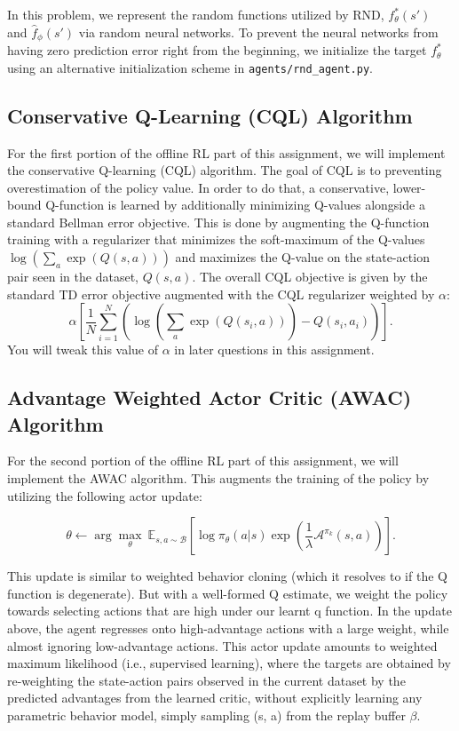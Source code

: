 \documentclass{article}
\begin{document}
In this problem, we represent the random functions utilized by RND, $f^*_\theta(s')$ and $\hat{f}_\phi(s')$ via random neural networks. To prevent the neural networks from having zero prediction error right from the beginning, we initialize the target $f^*_\theta$ using an alternative initialization scheme in \verb+agents/rnd_agent.py+. 

\subsection{Conservative Q-Learning (CQL) Algorithm}
For the first portion of the offline RL part of this assignment, we will implement the conservative Q-learning (CQL) algorithm. The goal of CQL is to preventing overestimation of the policy value. In order to do that, a conservative, lower-bound Q-function is learned by additionally minimizing Q-values alongside a standard Bellman error objective. This is done by augmenting the Q-function training with a regularizer that minimizes the soft-maximum of the Q-values $\log \left( \sum_{a} \exp(Q(s, a)) \right)$ and maximizes the Q-value on the state-action pair seen in the dataset, $Q(s, a)$. The overall CQL objective is given by the standard TD error objective augmented with the CQL regularizer weighted by $\alpha$: 
\[\alpha \left[\frac{1}{N}\sum_{i=1}^N \left(\log\left(\sum_{a} \exp(Q(s_i, a))\right) - Q(s_i, a_i) \right) \right].\] 
You will tweak this value of $\alpha$ in later questions in this assignment.  

\subsection{Advantage Weighted Actor Critic (AWAC) Algorithm}
For the second portion of the offline RL part of this assignment, we will implement the AWAC algorithm. This augments the training of the policy by utilizing the following actor update:

\begin{equation}
    \theta \leftarrow \arg \max_\theta~ \mathbb{E}_{s, a \sim \mathcal{B}} \left[\log \pi_{\theta}(a|s) \exp\left(\frac{1}{\lambda} \mathcal{A}^{\pi_{k}}(s,a)\right) \right].
\end{equation}

This update is similar to weighted behavior cloning (which it resolves to if the Q function is degenerate). But with a well-formed Q estimate, we weight the policy towards selecting actions that are high under our learnt q function. In the update above, the agent regresses onto high-advantage actions with a large weight, while almost ignoring low-advantage actions. This actor update amounts to weighted maximum likelihood (i.e., supervised learning), where the targets are obtained by re-weighting the state-action pairs observed in the current dataset
by the predicted advantages from the learned critic, without
explicitly learning any parametric behavior model, simply
sampling (s, a) from the replay buffer $\beta$. 
\end{document}
